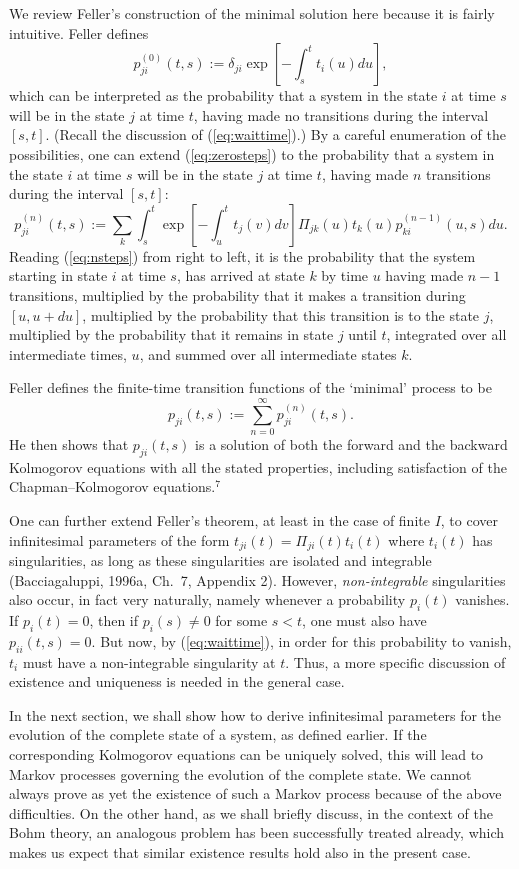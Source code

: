 \documentclass[12pt]{article}
\newcommand{\be}{\begin{equation}}
\newcommand{\ee}{\end{equation}}
\begin{document}
We review Feller's construction of the minimal solution here because it
is fairly intuitive.  Feller defines
\be
\label{eq:zerosteps}
p^{(0)}_{ji}(t,s) := \delta_{ji}\exp \left[ { -\int_s^t t_i(u)du }
\right],
\ee
which can be interpreted as the probability that a system in the state 
$i$ at time $s$ will be in the state $j$ at time $t$, having made no 
transitions during the interval $[s,t]$.  (Recall the discussion of 
(\ref{eq:waittime}).) By a careful enumeration of the possibilities, 
one can extend (\ref{eq:zerosteps}) to the probability that a system 
in the state $i$ at time $s$ will be in the state $j$ at time $t$, 
having made $n$ transitions during the interval $[s,t]$:
\be
\label{eq:nsteps}
p^{(n)}_{ji}(t,s) := \sum_k\int_s^t\exp \left[ { -\int_u^t t_j(v)dv}
\right] \Pi_{jk}(u)t_k(u)p^{(n-1)}_{ki}(u,s)du.
\ee
Reading (\ref{eq:nsteps}) from right to left, it is the probability 
that the system starting in state $i$ at time $s$, has arrived at 
state $k$ by time $u$ having made $n-1$ transitions, multiplied by the 
probability that it makes a transition during $[u,u+du]$, multiplied 
by the probability that this transition is to the state $j$, 
multiplied by the probability that it remains in state $j$ until $t$, 
integrated over all intermediate times, $u$, and summed over all 
intermediate states $k$.

Feller defines the finite-time transition functions of the `minimal'
process to be
\be
\label{eq:Fellerdef}
p_{ji}(t,s):=\sum_{n=0}^\infty p^{(n)}_{ji}(t,s).
\ee
He then shows that $p_{ji}(t,s)$ is a solution of both the forward
and the backward Kolmogorov equations with all the stated properties,
including satisfaction of the Chapman--Kolmogorov equations.$^7$

One can further extend Feller's theorem, at least in the case of 
finite $I$, to cover infinitesimal parameters of the form 
$t_{ji}(t)=\Pi_{ji}(t)t_i(t)$ where $t_i(t)$ has singularities, as 
long as these singularities are isolated and integrable 
(Bacciagaluppi, 1996a, Ch.~7, Appendix 2).  However, {\em 
non-integrable} singularities also occur, in fact very naturally, 
namely whenever a probability $p_i(t)$ vanishes.  If $p_i(t)=0$, then 
if $p_i(s)\neq 0$ for some $s<t$, one must also have $p_{ii}(t,s)=0$.  
But now, by (\ref{eq:waittime}), in order for this probability to 
vanish, $t_i$ must have a non-integrable singularity at $t$.  Thus, a 
more specific discussion of existence and uniqueness is needed in the 
general case.

In the next section, we shall show how to derive infinitesimal 
parameters for the evolution of the complete state of a system, as 
defined earlier.  If the corresponding Kolmogorov equations can be 
uniquely solved, this will lead to Markov processes governing the 
evolution of the complete state.  We cannot always prove as yet the 
existence of such a Markov process because of the above difficulties.  
On the other hand, as we shall briefly discuss, in the context of the 
Bohm theory, an analogous problem has been successfully treated 
already, which makes us expect that similar existence results hold 
also in the present case.
\end{document}
